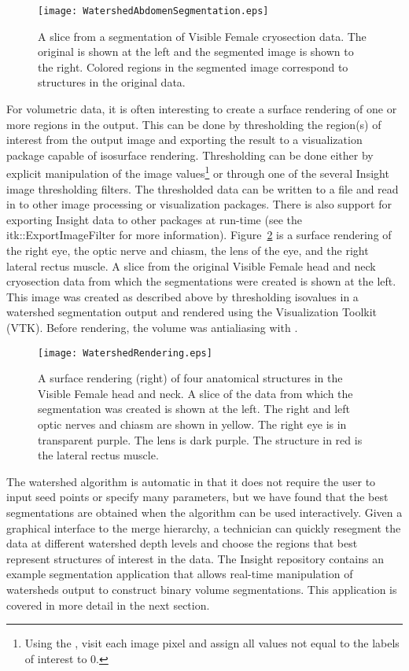 \begin{figure}
\centering
\texttt{[image: WatershedAbdomenSegmentation.eps]}
\caption{A slice from a segmentation of Visible Female cryosection data.
The original is shown at the left and the segmented image is shown to the
right. Colored regions in the segmented image correspond to structures in the
original data. }
\protect\label{fig:colorVisWatersheds}
\end{figure}

For volumetric data, it is often interesting to create a surface rendering of
one or more regions in the output.  This can be done by thresholding the
region(s) of interest from the output image and exporting the result to a
visualization package capable of isosurface rendering.  Thresholding can be
done either by explicit manipulation of the image values\footnote{Using the
, visit each image pixel and assign all values not
equal to the labels of interest to 0.} or through one of the several Insight
image thresholding filters.  The thresholded data can be written to a file and
read in to other image processing or visualization packages.  There is also
support for exporting Insight data to other packages at run-time (see the
itk::ExportImageFilter for more information).
Figure~\ref{fig:surfaceRenderingWatersheds} is a surface rendering of the right
eye, the optic nerve and chiasm, the lens of the eye, and the right lateral
rectus muscle.  A slice from the original Visible Female head and neck
cryosection data from which the segmentations were created is shown at the
left.  This image was created as described above by thresholding isovalues in a
watershed segmentation output and rendered using the Visualization Toolkit
(VTK).  Before rendering, the volume was antialiasing with
.


\begin{figure}
\centering
\texttt{[image: WatershedRendering.eps]}
\caption{A surface rendering (right) of four anatomical structures in the Visible
Female head and neck. A slice of the data from which the segmentation was
created is shown at the left.  The right and left optic nerves and chiasm are
shown in yellow.  The right eye is in transparent purple.  The lens is dark
purple.  The structure in red is the lateral rectus muscle.}
\protect\label{fig:surfaceRenderingWatersheds}
\end{figure}

The watershed algorithm is automatic in that it does not require the user to
input seed points or specify many parameters, but we have found that the best
segmentations are obtained when the algorithm can be used interactively.  Given
a graphical interface to the merge hierarchy, a technician can quickly
resegment the data at different watershed depth levels and choose the regions
that best represent structures of interest in the data.  The Insight
repository contains an example segmentation application that allows real-time
manipulation of watersheds output to construct binary volume segmentations.
This application is covered in more detail in the next section.

